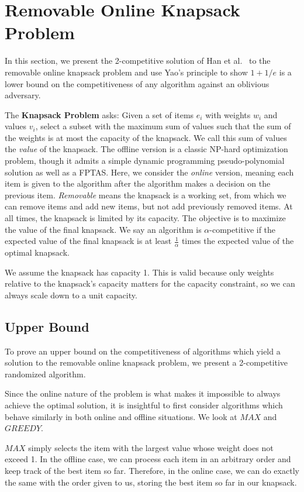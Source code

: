 \section{Removable Online Knapsack Problem}
In this section, we present the 2-competitive solution of Han et al.~\cite{han} to the removable online knapsack problem and use Yao's principle to show $1+1/e$ is a lower bound on the competitiveness of any algorithm against an oblivious adversary.

The \textbf{Knapsack Problem} asks: Given a set of items $e_i$ with weights $w_i$ and values $v_i$, select a subset with the maximum sum of values such that the sum of the weights is at most the capacity of the knapsack. We call this sum of values the \emph{value} of the knapsack. The offline version is a classic NP-hard optimization problem, though it admits a simple dynamic programming pseudo-polynomial solution as well as a FPTAS. Here, we consider the \emph{online} version, meaning each item is given to the algorithm after the algorithm makes a decision on the previous item. \emph{Removable} means the knapsack is a working set, from which we can remove items and add new items, but not add previously removed items. At all times, the knapsack is limited by its capacity. The objective is to maximize the value of the final knapsack. We say an algorithm is $\alpha$-competitive if the expected value of the final knapsack is at least $\frac{1}{\alpha}$ times the expected value of the optimal knapsack.

We assume the knapsack has capacity 1. This is valid because only weights relative to the knapsack's capacity matters for the capacity constraint, so we can always scale down to a unit capacity.

\subsection{Upper Bound} %
To prove an upper bound on the competitiveness of algorithms which yield a solution to the removable online knapsack problem, we present a 2-competitive randomized algorithm.

Since the online nature of the problem is what makes it impossible to always achieve the optimal solution, it is insightful to first consider algorithms which behave similarly in both online and offline situations. We look at $MAX$ and $GREEDY$.

$MAX$ simply selects the item with the largest value whose weight does not exceed 1. In the offline case, we can process each item in an arbitrary order and keep track of the best item so far. Therefore, in the online case, we can do exactly the same with the order given to us, storing the best item so far in our knapsack.

